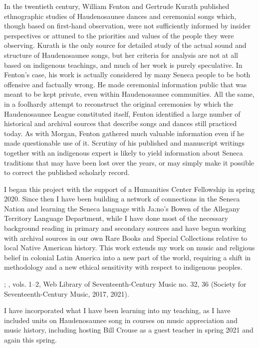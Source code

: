 \documentclass[12pt]{article}
\begin{document}
In the twentieth century, William Fenton and Gertrude Kurath published
ethnographic studies of Haudenosaunee dances and ceremonial songs which,
though based on first-hand observation, were not sufficiently informed by
insider perspectives or attuned to the priorities and values of the people
they were observing.%
\Autocites{Fenton:GreatLaw}{Kurath:IroquoisMusic}
Kurath is the only source for detailed study of the actual sound and structure
of Haudenosaunee songs, but her criteria for analysis are not at all based on
indigenous teachings, and much of her work is purely speculative.
In Fenton's case, his work is actually considered by many Seneca people to be
both offensive and factually wrong.
He made ceremonial information public that was meant to be kept private, even
within Haudenosaunee communities.
All the same, in a foolhardy attempt to reconstruct the original ceremonies by
which the Haudenosaunee League constituted itself, Fenton identified a large
number of historical and archival sources that describe songs and dances still
practiced today.
As with Morgan, Fenton gathered much valuable information even if he made
questionable use of it.
Scrutiny of his published and manuscript writings together with an indigenous
expert is likely to yield information about Seneca traditions that may have
been lost over the years, or may simply make it possible to correct the
published scholarly record.

I began this project with the support of a Humanities Center Fellowship in
spring 2020. 
Since then I have been building a network of connections in the Seneca Nation 
and learning the Seneca language with Ja:no's Bowen of the Allegany Territory
Language Department, while I have done most of the necessary background
reading in primary and secondary sources and have begun working with archival
sources in our own Rare Books and Special Collections relative to local Native
American history.
This work extends my work on music and religious belief in colonial Latin
America into a new part of the world, requiring a shift in methodology and a
new ethical sensitivity with respect to indigenous peoples.%
\begin{Footnote}
    \Autocites{Cashner:HearingFaith}
    {Cashner:Cards}
    {Cashner:ImitatingAfricans};
    , vols. 1--2, Web Library of Seventeenth-Century Music no. 32, 36
    (Society for Seventeenth-Century Music, 2017, 2021).
\end{Footnote}
I have incorporated what I have been learning into my teaching, as I have
included units on Haudenosaunee song in courses on music appreciation and
music history, including hosting Bill Crouse as a guest teacher in spring 2021
and again this spring.
\end{document}
